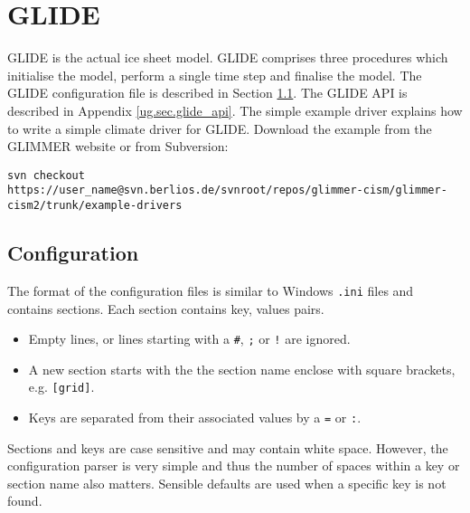 \section{GLIDE}
GLIDE is the actual ice sheet model. GLIDE comprises three procedures which initialise the model, perform a single time step and finalise the model. The GLIDE configuration file is described in Section \ref{ug.sec.config}. The GLIDE API is described in Appendix \ref{ug.sec.glide_api}. The simple example driver explains how to write a simple climate driver for GLIDE. Download the example from the GLIMMER website or from Subversion:
\begin{verbatim}
svn checkout
https://user_name@svn.berlios.de/svnroot/repos/glimmer-cism/glimmer-cism2/trunk/example-drivers
\end{verbatim}

\subsection{Configuration}\label{ug.sec.config}
The format of the configuration files is similar to Windows \texttt{.ini} files and contains sections. Each section contains key, values pairs.
\begin{itemize}
\item Empty lines, or lines starting with a \texttt{\#}, \texttt{;} or \texttt{!} are ignored.
\item A new section starts with the the section name enclose with square brackets, e.g. \texttt{[grid]}.
\item Keys are separated from their associated values by a \texttt{=} or \texttt{:}.
\end{itemize}
Sections and keys are case sensitive and may contain white space. However, the configuration parser is very simple and thus the number of spaces within a key or section name also matters. Sensible defaults are used when a specific key is not found.

